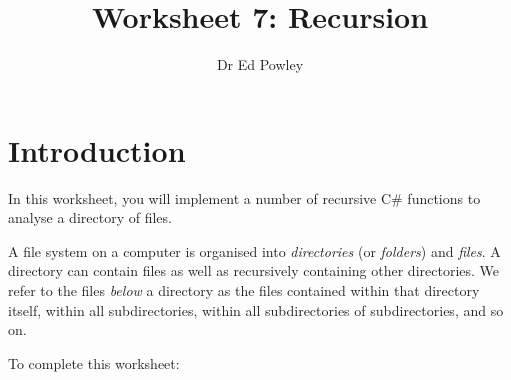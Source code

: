 \documentclass{../../../fal_assignment}
\title{Worksheet 7: Recursion}
\author{Dr Ed Powley}
\begin{document}
\maketitle

\section*{Introduction}

In this worksheet, you will implement a number of recursive C\# functions to analyse a directory of files.

A file system on a computer is organised into \emph{directories} (or \emph{folders}) and \emph{files}.
A directory can contain files as well as recursively containing other directories.
We refer to the files \emph{below} a directory as the files contained within that directory itself,
within all subdirectories, within all subdirectories of subdirectories, and so on.

To complete this worksheet:
\end{document}

